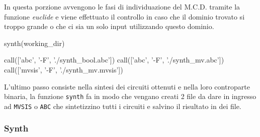 \documentclass[italian,]{book}
\newenvironment{Shaded}{\begin{snugshade}}{\end{snugshade}}
\newcommand{\BuiltInTok}[1]{#1}
\newcommand{\ControlFlowTok}[1]{\textcolor[rgb]{0.13,0.29,0.53}{\textbf{#1}}}
\newcommand{\DecValTok}[1]{\textcolor[rgb]{0.00,0.00,0.81}{#1}}
\newcommand{\KeywordTok}[1]{\textcolor[rgb]{0.13,0.29,0.53}{\textbf{#1}}}
\newcommand{\NormalTok}[1]{#1}
\newcommand{\OperatorTok}[1]{\textcolor[rgb]{0.81,0.36,0.00}{\textbf{#1}}}
\newcommand{\StringTok}[1]{\textcolor[rgb]{0.31,0.60,0.02}{#1}}
\begin{document}
\newpage

\begin{Shaded}
\end{Shaded}

In questa porzione avvengono le fasi di individuazione del M.C.D. tramite la funzione \emph{euclide} e viene effettuato il controllo in caso che il dominio trovato si troppo grande o che ci sia un solo input utilizzando questo dominio.

\begin{Shaded}
\begin{Highlighting}[]
\NormalTok{synth(working_dir)}

\NormalTok{call([}\StringTok{'abc'}\NormalTok{, }\StringTok{'-F'}\NormalTok{, }\StringTok{'./synth_bool.abc'}\NormalTok{])}
\NormalTok{call([}\StringTok{'abc'}\NormalTok{, }\StringTok{'-F'}\NormalTok{, }\StringTok{'./synth_mv.abc'}\NormalTok{])}
\NormalTok{call([}\StringTok{'mvsis'}\NormalTok{, }\StringTok{'-F'}\NormalTok{, }\StringTok{'./synth_mv.mvsis'}\NormalTok{])}
\end{Highlighting}
\end{Shaded}

L'ultimo passo consiste nella sintesi dei circuiti ottenuti e nella loro controparte binaria, la funzione \texttt{synth} fa in modo che vengano creati 2 file da dare in ingresso ad \texttt{MVSIS} o \texttt{ABC} che sintetizzino tutti i circuiti e salvino il risultato in dei file.

\hypertarget{synth}{%
\subsubsection{Synth}\label{synth}}
\end{document}

